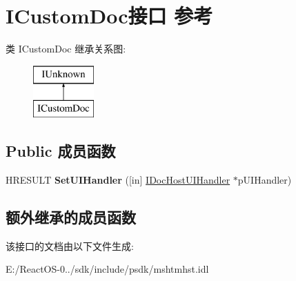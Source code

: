 \hypertarget{interface_i_custom_doc}{}\section{I\+Custom\+Doc接口 参考}
\label{interface_i_custom_doc}
类 I\+Custom\+Doc 继承关系图\+:\begin{figure}[H]
\begin{center}
\leavevmode
\includegraphics[height=2.000000cm]{interface_i_custom_doc}
\end{center}
\end{figure}
\subsection*{Public 成员函数}
\begin{DoxyCompactItemize}
\item 
\mbox{\label{interface_i_custom_doc_ad1bf308bef0b2902efd595739062edd0}} 
H\+R\+E\+S\+U\+LT {\bfseries Set\+U\+I\+Handler} (\mbox{[}in\mbox{]} \hyperlink{interface_i_doc_host_u_i_handler}{I\+Doc\+Host\+U\+I\+Handler} $\ast$p\+U\+I\+Handler)
\end{DoxyCompactItemize}
\subsection*{额外继承的成员函数}


该接口的文档由以下文件生成\+:\begin{DoxyCompactItemize}
\item 
E\+:/\+React\+O\+S-\/0../sdk/include/psdk/mshtmhst.\+idl\end{DoxyCompactItemize}
